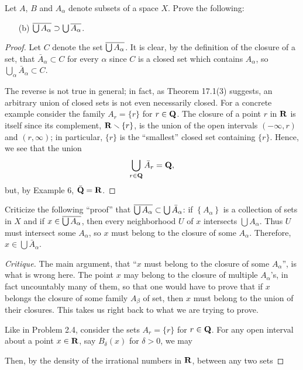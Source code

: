 \newpage
\begin{problem}[Munkres \S17, p.\,101, 6(c)]
Let $A$, $B$ and $A_\alpha$ denote subsets of a space $X$. Prove
the following:
\begin{enumerate}[noitemsep]
\item[(b)] $\overline{\bigcup A_\alpha}\supset\bigcup\overline{A_\alpha}$.
\end{enumerate}
\end{problem}
\begin{proof}
Let $C$ denote the set $\overline{\bigcup A_\alpha}$. It is clear, by
the definition of the closure of a set, that $\bar
A_\alpha\subset C$ for every $\alpha$ since $C$ is a closed set
which contains $A_\alpha$, so $\bigcup_\alpha \bar
A_\alpha\subset C$.

The reverse is not true in general; in fact, as Theorem 17.1(3)
suggests, an arbitrary union of closed sets is not even
necessarily closed. For a concrete example consider the family
$A_r=\{r\}$ for $r\in\mathbf{Q}$. The closure of a point $r$ in $\mathbf{R}$ is
itself since its complement, $\mathbf{R}\smallsetminus\{r\}$, is the
union of the open intervals $(-\infty,r)$ and $(r,\infty)$; in
particular, $\{r\}$ is the ``smallest'' closed set containing
$\{r\}$. Hence, we see that the union
\[
\bigcup_{r\in\mathbf{Q}}\bar A_r=\mathbf{Q},
\]
but, by Example 6, $\bar{\mathbf{Q}}=\mathbf{R}$.
\end{proof}
\newpage
\begin{problem}[Munkres \S17, p.\,101, 7]
Criticize the following ``proof'' that $\overline{\bigcup
  A_\alpha}\subset\bigcup\bar A_\alpha$: if
$\left\{A_\alpha\right\}$ is a collection of sets in $X$ and if
$x\in\overline{\bigcup A_\alpha}$, then every neighborhood $U$ of $x$
intersects $\bigcup A_\alpha$. Thus $U$ must intersect some
$A_\alpha$, so $x$ must belong to the closure of some
$A_\alpha$. Therefore, $x\in\bigcup\bar A_\alpha$.
\end{problem}
\begin{proof}[Critique]
The main argument, that ``$x$ must belong to the closure of some
$A_\alpha$'', is what is wrong here. The point $x$ may belong to
the closure of multiple $A_\alpha$'s, in fact uncountably many of
them, so that one would have to prove that if $x$ belongs the
closure of some family $A_\beta$ of set, then $x$ must belong to
the union of their closures. This takes us right back to what we
are trying to prove.

Like in Problem 2.4, consider the sets $A_r=\{r\}$ for
$r\in\mathbf{Q}$. For any open interval about a point $x\in\mathbf{R}$, say
$B_\delta(x)$ for $\delta>0$, we may

Then, by the density of the irrational numbers in
$\mathbf{R}$, between any two sets
\end{proof}
